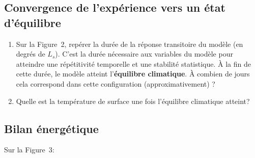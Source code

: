 \documentclass[a4paper,12pt]{article}
\begin{document}
\subsection{Convergence de l'expérience vers un état d'équilibre}
\label{ssct-equilibre}

\begin{enumerate}
\item Sur la Figure~2, repérer la durée de la réponse transitoire du modèle (en
degrés de $L_s$). C'est la durée nécessaire aux variables du modèle pour
atteindre une répétitivité temporelle et une stabilité statistique. \`A la fin
de cette durée, le modèle atteint l'\textbf{équilibre climatique}. \`A combien
de jours cela correspond dans cette configuration (approximativement) ?
\item Quelle est la température de surface une fois l'équilibre climatique
atteint?
\end{enumerate}

\subsection{Bilan énergétique}

Sur la Figure~3:
\end{document}
